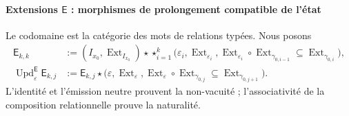 \paragraph{Extensions \(\mathsf E\) : morphismes de prolongement compatible de l'état}
Le codomaine est la catégorie des mots de relations typées. Nous posons
\begin{align}
 \mathsf E_{k,k}
 &:=(I_{x_0},\operatorname{Ext}_{I_{x_0}})\star
 \mathop{\star}_{i=1}^{k}
 \bigl(\varepsilon_i,\operatorname{Ext}_{\varepsilon_i},
 \operatorname{Ext}_{\varepsilon_i}\circ
 \operatorname{Ext}_{\gamma_{0,i-1}}
 \subseteq\operatorname{Ext}_{\gamma_{0,i}}\bigr),
 \label{eq:pdfv2-terminal-semilla-e}\\
 \operatorname{Upd}^{\mathsf E}_{\varepsilon}\mathsf E_{k,j}
 &:=
 \mathsf E_{k,j}\star
 \bigl(\varepsilon,\operatorname{Ext}_{\varepsilon},
 \operatorname{Ext}_{\varepsilon}\circ
 \operatorname{Ext}_{\gamma_{0,j}}
 \subseteq\operatorname{Ext}_{\gamma_{0,j+1}}\bigr).
 \label{eq:pdfv2-terminal-update-e}
\end{align}
L'identité et l'émission neutre prouvent la non-vacuité ; l'associativité de la composition relationnelle prouve la naturalité.


